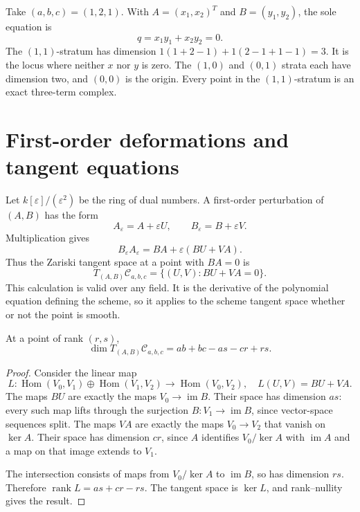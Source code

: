 \begin{example}
Take $(a,b,c)=(1,2,1)$. With $A=(x_1,x_2)^T$ and $B=(y_1,y_2)$, the sole equation is
\[
q=x_1y_1+x_2y_2=0.
\]
The $(1,1)$-stratum has dimension $1(1+2-1)+1(2-1+1-1)=3$. It is the locus where neither $x$ nor $y$ is zero. The $(1,0)$ and $(0,1)$ strata each have dimension two, and $(0,0)$ is the origin. Every point in the $(1,1)$-stratum is an exact three-term complex.
\end{example}

\section{First-order deformations and tangent equations}

Let $k[\varepsilon]/(\varepsilon^2)$ be the ring of dual numbers. A first-order perturbation of $(A,B)$ has the form
\[
A_\varepsilon=A+\varepsilon U,
\qquad B_\varepsilon=B+\varepsilon V.
\]
Multiplication gives
\[
B_\varepsilon A_\varepsilon
=BA+\varepsilon(BU+VA).
\]
Thus the Zariski tangent space at a point with $BA=0$ is
\[
T_{(A,B)}\mathcal C_{a,b,c}
=\{(U,V):BU+VA=0\}.
\]
This calculation is valid over any field. It is the derivative of the polynomial equation defining the scheme, so it applies to the scheme tangent space whether or not the point is smooth.

\begin{proposition}
At a point of rank $(r,s)$,
\[
\dim T_{(A,B)}\mathcal C_{a,b,c}
=ab+bc-as-cr+rs.
\]
\end{proposition}
\begin{proof}
Consider the linear map
\[
L:\operatorname{Hom}(V_0,V_1)\oplus\operatorname{Hom}(V_1,V_2)
 \longrightarrow\operatorname{Hom}(V_0,V_2),
\quad L(U,V)=BU+VA.
\]
The maps $BU$ are exactly the maps $V_0\to\operatorname{im}B$. Their space has dimension $as$: every such map lifts through the surjection $B:V_1\to\operatorname{im}B$, since vector-space sequences split. The maps $VA$ are exactly the maps $V_0\to V_2$ that vanish on $\ker A$. Their space has dimension $cr$, since $A$ identifies $V_0/\ker A$ with $\operatorname{im}A$ and a map on that image extends to $V_1$.

The intersection consists of maps from $V_0/\ker A$ to $\operatorname{im}B$, so has dimension $rs$. Therefore $\operatorname{rank}L=as+cr-rs$. The tangent space is $\ker L$, and rank--nullity gives the result.
\end{proof}

